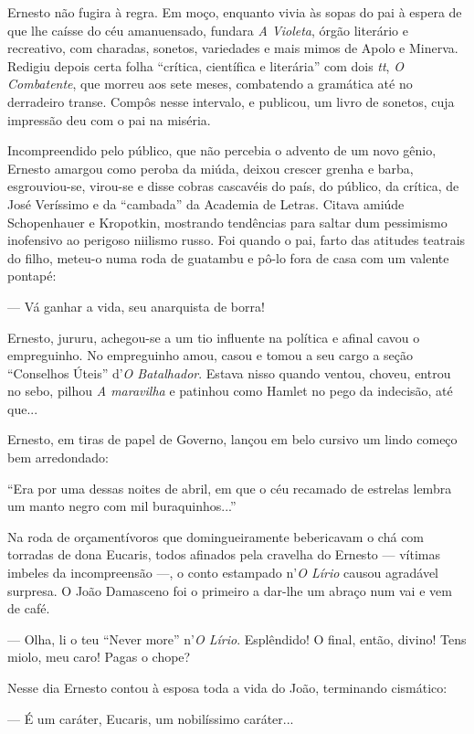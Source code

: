 Ernesto não fugira à regra. Em moço, enquanto vivia às sopas do pai à
espera de que lhe caísse do céu amanuensado, fundara \emph{A Violeta},
órgão literário e recreativo, com charadas, sonetos, variedades e mais
mimos de Apolo e Minerva. Redigiu depois certa folha ``crítica,
científica e literária'' com dois \emph{tt}, \emph{O Combatente}, que
morreu aos sete meses, combatendo a gramática até no derradeiro transe.
Compôs nesse intervalo, e publicou, um livro de sonetos, cuja impressão
deu com o pai na miséria.

Incompreendido pelo público, que não percebia o advento de um novo
gênio, Ernesto amargou como peroba da miúda, deixou crescer grenha e
barba, esgrouviou-se, virou-se e disse cobras cascavéis do país, do
público, da crítica, de José Veríssimo e da ``cambada'' da Academia de
Letras. Citava amiúde Schopenhauer e Kropotkin, mostrando tendências
para saltar dum pessimismo inofensivo ao perigoso niilismo russo. Foi
quando o pai, farto das atitudes teatrais do filho, meteu-o numa roda de
guatambu e pô-lo fora de casa com um valente pontapé:

--- Vá ganhar a vida, seu anarquista de borra!

Ernesto, jururu, achegou-se a um tio influente na política e afinal
cavou o empreguinho. No empreguinho amou, casou e tomou a seu cargo a
seção ``Conselhos Úteis'' d'\emph{O Batalhador}. Estava nisso quando
ventou, choveu, entrou no sebo, pilhou \emph{A maravilha} e patinhou
como Hamlet no pego da indecisão, até que...

Ernesto, em tiras de papel de Governo, lançou em belo cursivo um lindo
começo bem arredondado:

``Era por uma dessas noites de abril, em que o céu recamado de estrelas
lembra um manto negro com mil buraquinhos...''

Na roda de orçamentívoros que domingueiramente bebericavam o chá com
torradas de dona Eucaris, todos afinados pela cravelha do Ernesto ---
vítimas imbeles da incompreensão ---, o conto estampado n'\emph{O Lírio}
causou agradável surpresa. O João Damasceno foi o primeiro a dar-lhe um
abraço num vai e vem de café.

--- Olha, li o teu ``Never more'' n'\emph{O Lírio}. Esplêndido! O final,
então, divino! Tens miolo, meu caro! Pagas o chope?

Nesse dia Ernesto contou à esposa toda a vida do João, terminando
cismático:

--- É um caráter, Eucaris, um nobilíssimo caráter...

